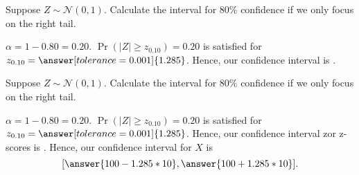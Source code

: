 \documentclass{ximera}
\begin{document}
\begin{problem}
Suppose $Z\sim \mathcal N(0,1)$. Calculate the interval for $80\%$ confidence if we only focus on the right tail. 
\begin{explanation}
$\alpha=1-0.80=0.20$.
$\Pr(|Z|\geq z_{0.10})=0.20$ is satisfied for $z_{0.10}=\answer[tolerance=0.001]{1.285}$. Hence, our confidence interval is \wordChoice{\choice{$[0,1.285]$} \choice{$[-1.285,0]$} \choice[correct]{$[-1.285,2.285]$}}. 

\end{explanation}
\end{problem}


\begin{problem}
Suppose $Z\sim \mathcal N(0,1)$. Calculate the interval for $80\%$ confidence if we only focus on the right tail. 
\begin{explanation}
$\alpha=1-0.80=0.20$.
$\Pr(|Z|\geq z_{0.10})=0.20$ is satisfied for $z_{0.10}=\answer[tolerance=0.001]{1.285}$. Hence, our confidence interval zor z-scores is \wordChoice{\choice{$[0,1.285]$} \choice{$[-1.285,0]$} \choice[correct]{$[-1.285,2.285]$}}.
Hence, our confidence interval for $X$ is
$$[\answer{100-1.285*10},\answer{100+1.285*10}].$$

\end{explanation}
\end{problem}
\end{document}
